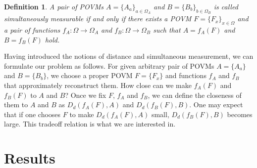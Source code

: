 \documentclass[12pt,showpacs,preprintnumbers,amsmath,amssymb]{revtex4-2}
\newtheorem{definition}{Definition}
\begin{document}
\begin{definition}
A pair of POVMs $A=\{A_a\}_{a\in \Omega_A}$ and $B=\{B_b\}_{b \in \Omega_B}$
is called simultaneously measurable if and only if 
there exists a POVM $F=\{F_x\}_{x \in \Omega}$ and a pair of 
functions $f_A: \Omega \to \Omega_A$ and $f_B: \Omega \to \Omega_B$ 
such that $A=f_A(F)$ and $B=f_B(F)$ hold. 
\end{definition}
\par
Having introduced the notions of distance and simultaneous 
measurement, we can formulate our problem as follows.
For given arbitrary pair of POVMs $A=\{A_a\}$ and $B=\{B_b\}$, 
we choose a proper POVM $F=\{F_x\}$ and functions $f_A$ and $f_B$ 
that approximately
 reconstruct them. How close can we make
  $f_A(F)$ and $f_B(F)$ 
 to $A$ and $B$? 
 Once we fix $F$, $f_A$ and $f_B$, we can define 
 the closeness of them to $A$ and $B$ as $D_d(f_A(F),A)$ and 
 $D_d(f_B(F), B)$. 
 One may expect that if one chooses $F$ to make 
 $D_d(f_A(F),A)$ small, $D_d(f_B(F),B)$ becomes 
 large. This tradeoff relation is what we are interested in. 
 \section{Results}\label{sec:main}
\end{document}
